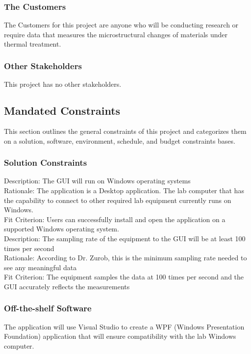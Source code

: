 \documentclass[12pt, titlepage]{article}
\begin{document}
\subsubsection{The Customers}
The Customers for this project are anyone who will be conducting research or require data that measures the microstructural changes of materials under thermal treatment.   

\subsubsection{Other Stakeholders}
This project has no other stakeholders.

\subsection{Mandated Constraints}
This section outlines the general constraints of this project and categorizes them on a solution, software, environment, schedule, and budget constraints bases.

\subsubsection{Solution Constraints}

Description: The GUI will run on Windows operating systems\\ 
Rationale: The application is a Desktop application. The lab computer that has the capability to connect to other required lab equipment currently runs on Windows.\\
Fit Criterion: Users can successfully install and open the application on a supported Windows operating system. \\

\noindent Description: The sampling rate of the equipment to the GUI will be at least 100 times per second\\ 
Rationale: According to Dr. Zurob, this is the minimum sampling rate needed to see any meaningful data\\
Fit Criterion: The equipment samples the data at 100 times per second and the GUI accurately reflects the measurements  \\

\subsubsection{Off-the-shelf Software}
The application will use Visual Studio to create a WPF (Windows Presentation Foundation) application that will ensure compatibility with the lab Windows computer.
\end{document}
